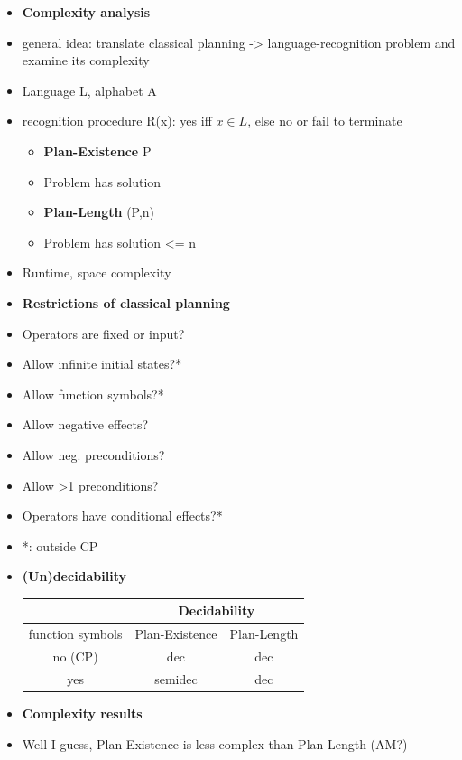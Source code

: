 \begin{itemize}
\item \textbf{Complexity analysis}
\item general idea: translate classical planning -> language-recognition problem and examine its complexity
\item Language L, alphabet A
\item recognition procedure R(x): yes iff $x \in L$, else no or fail to terminate

	\begin{itemize}
	\item \textbf{Plan-Existence} P
	\item Problem has solution
	\item \textbf{Plan-Length} (P,n)
	\item Problem has solution <= n
	\end{itemize}

\item Runtime, space complexity

\item \textbf{Restrictions of classical planning}
\item Operators are fixed or input?
\item Allow infinite initial states?*
\item Allow function symbols?*
\item Allow negative effects?
\item Allow neg. preconditions?
\item Allow >1 preconditions?
\item Operators have conditional effects?*
\item *: outside CP

\item \textbf{(Un)decidability}

\begin{tabular}{|c|c|c|}
\hline 
& \multicolumn{2}{c|}{Decidability} \\ 
\hline 
function symbols & Plan-Existence &Plan-Length \\ 
\hline 
no (CP) & dec & dec \\ 
\hline 
yes & semidec & dec \\ 
\hline 
\end{tabular} 


\item \textbf{Complexity results}
\item Well I guess, Plan-Existence is less complex than Plan-Length (AM?)


\end{itemize}
